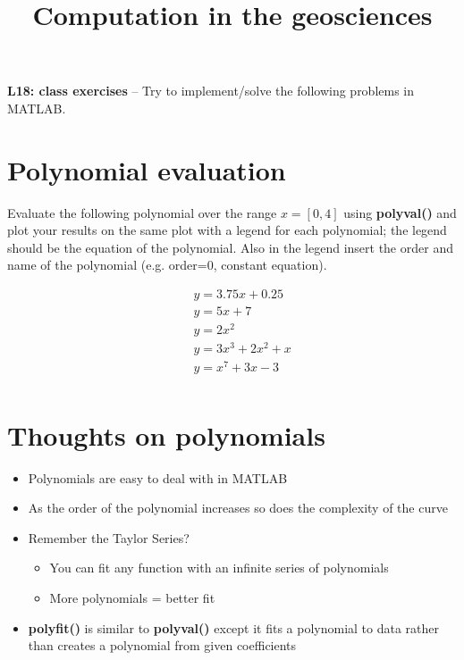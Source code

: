 \documentclass[10pt,fleqn]{article}
\title{Computation in the geosciences}
\date{\empty}
\begin{document}
\textbf{L18: class exercises} -- Try to implement/solve the following problems in MATLAB.


\section*{Polynomial evaluation}

Evaluate the following polynomial over the range $x=[0,4]$ using \textbf{polyval()} and plot your results on the same plot with a legend for each polynomial; the legend should be the equation of the polynomial. Also in the legend insert the order and name of the polynomial (e.g. order=0, constant equation).

\begin{eqnarray} \nonumber
&& y = 3.75x + 0.25 \\ \nonumber
&& y = 5x + 7 \\ \nonumber
&& y = 2x^2 \\ \nonumber
&& y = 3x^3 + 2x^2 + x\\ \nonumber
&& y = x^7 + 3x - 3 \\ \nonumber
\end{eqnarray}

\section*{Thoughts on polynomials}


\begin{itemize}
	\item Polynomials are easy to deal with in MATLAB
	\item As the order of the polynomial increases so does the complexity of the curve
	\item Remember the Taylor Series?
	\begin{itemize}
		\item You can fit any function with an infinite series of polynomials
		\item More polynomials = better fit
	\end{itemize}
	\item \textbf{polyfit()} is similar to \textbf{polyval()} except it fits a polynomial to data rather than creates a polynomial from given coefficients
\end{itemize}
\end{document}
